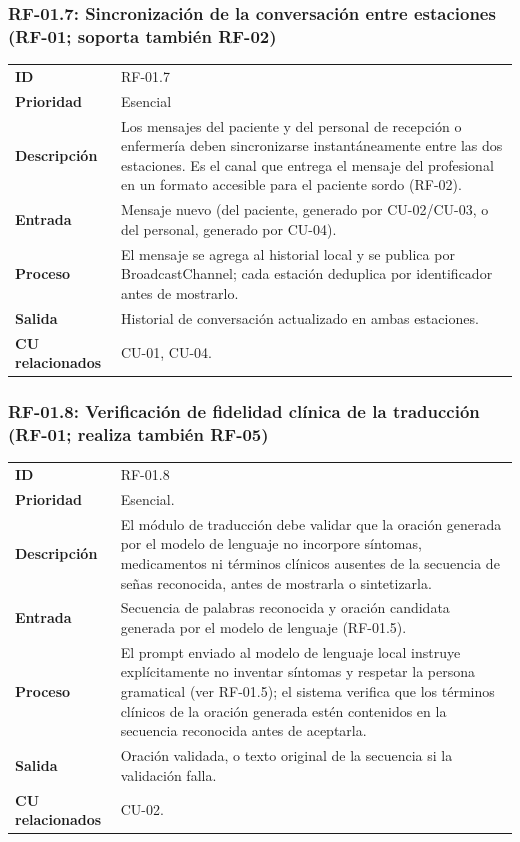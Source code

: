\subsubsection{RF-01.7: Sincronización de la conversación entre estaciones (RF-01; soporta también RF-02)}
\begin{table}[H]
\centering
\begin{tabularx}{\textwidth}{l X}
\toprule
\textbf{ID} & RF-01.7 \\
\textbf{Prioridad} & Esencial \\
\textbf{Descripción} & Los mensajes del paciente y del personal de recepción o enfermería deben sincronizarse instantáneamente entre las dos estaciones. Es el canal que entrega el mensaje del profesional en un formato accesible para el paciente sordo (RF-02). \\
\textbf{Entrada} & Mensaje nuevo (del paciente, generado por CU-02/CU-03, o del personal, generado por CU-04). \\
\textbf{Proceso} & El mensaje se agrega al historial local y se publica por BroadcastChannel; cada estación deduplica por identificador antes de mostrarlo. \\
\textbf{Salida} & Historial de conversación actualizado en ambas estaciones. \\
\textbf{CU relacionados} & CU-01, CU-04. \\
\bottomrule
\end{tabularx}
\end{table}

\subsubsection{RF-01.8: Verificación de fidelidad clínica de la traducción (RF-01; realiza también RF-05)}
\begin{table}[H]
\centering
\begin{tabularx}{\textwidth}{l X}
\toprule
\textbf{ID} & RF-01.8 \\
\textbf{Prioridad} & Esencial. \\
\textbf{Descripción} & El módulo de traducción debe validar que la oración generada por el modelo de lenguaje no incorpore síntomas, medicamentos ni términos clínicos ausentes de la secuencia de señas reconocida, antes de mostrarla o sintetizarla. \\
\textbf{Entrada} & Secuencia de palabras reconocida y oración candidata generada por el modelo de lenguaje (RF-01.5). \\
\textbf{Proceso} & El prompt enviado al modelo de lenguaje local instruye explícitamente no inventar síntomas y respetar la persona gramatical (ver RF-01.5); el sistema verifica que los términos clínicos de la oración generada estén contenidos en la secuencia reconocida antes de aceptarla. \\
\textbf{Salida} & Oración validada, o texto original de la secuencia si la validación falla. \\
\textbf{CU relacionados} & CU-02. \\
\bottomrule
\end{tabularx}
\end{table}

